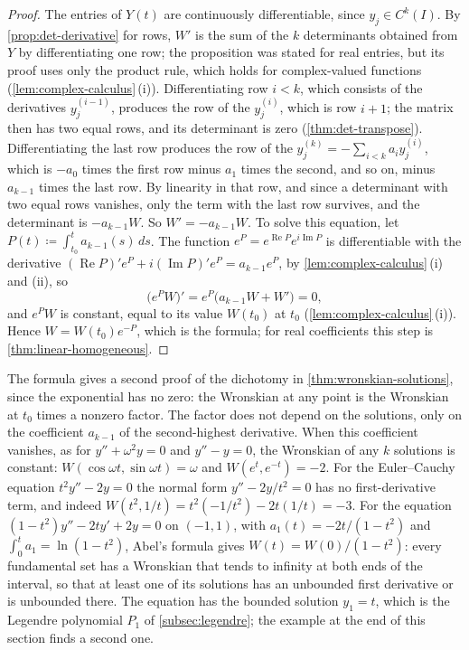 \begin{proof}
The entries of $Y(t)$ are continuously differentiable, since $y_j\in C^k(I)$. By \cref{prop:det-derivative} for rows, $W'$ is the sum of the $k$ determinants obtained from $Y$ by differentiating one row; the proposition was stated for real entries, but its proof uses only the product rule, which holds for complex-valued functions (\cref{lem:complex-calculus}\,(i)). Differentiating row $i<k$, which consists of the derivatives $y_j^{(i-1)}$, produces the row of the $y_j^{(i)}$, which is row $i+1$; the matrix then has two equal rows, and its determinant is zero (\cref{thm:det-transpose}). Differentiating the last row produces the row of the $y_j^{(k)}=-\sum_{i<k}a_iy_j^{(i)}$, which is $-a_0$ times the first row minus $a_1$ times the second, and so on, minus $a_{k-1}$ times the last row. By linearity in that row, and since a determinant with two equal rows vanishes, only the term with the last row survives, and the determinant is $-a_{k-1}W$. So $W'=-a_{k-1}W$. To solve this equation, let $P(t)\coloneqq\int_{t_0}^ta_{k-1}(s)\,ds$. The function $e^P=e^{\operatorname{Re}P}e^{i\operatorname{Im}P}$ is differentiable with the derivative $(\operatorname{Re}P)'e^P+i(\operatorname{Im}P)'e^P=a_{k-1}e^P$, by \cref{lem:complex-calculus}\,(i) and (ii), so
\[
\bigl(e^PW\bigr)'=e^P\bigl(a_{k-1}W+W'\bigr)=0 ,
\]
and $e^PW$ is constant, equal to its value $W(t_0)$ at $t_0$ (\cref{lem:complex-calculus}\,(i)). Hence $W=W(t_0)e^{-P}$, which is the formula; for real coefficients this step is \cref{thm:linear-homogeneous}.
\end{proof}

The formula gives a second proof of the dichotomy in \cref{thm:wronskian-solutions}, since the exponential has no zero: the Wronskian at any point is the Wronskian at $t_0$ times a nonzero factor. The factor does not depend on the solutions, only on the coefficient $a_{k-1}$ of the second-highest derivative. When this coefficient vanishes, as for $y''+\omega^2y=0$ and $y''-y=0$, the Wronskian of any $k$ solutions is constant: $W(\cos\omega t,\sin\omega t)=\omega$ and $W(e^t,e^{-t})=-2$. For the Euler--Cauchy equation $t^2y''-2y=0$ the normal form $y''-2y/t^2=0$ has no first-derivative term, and indeed $W(t^2,1/t)=t^2(-1/t^2)-2t(1/t)=-3$. For the equation $(1-t^2)y''-2ty'+2y=0$ on $(-1,1)$, with $a_1(t)=-2t/(1-t^2)$ and $\int_0^ta_1=\ln(1-t^2)$, Abel's formula gives $W(t)=W(0)/(1-t^2)$: every fundamental set has a Wronskian that tends to infinity at both ends of the interval, so that at least one of its solutions has an unbounded first derivative or is unbounded there. The equation has the bounded solution $y_1=t$, which is the Legendre polynomial $P_1$ of \cref{subsec:legendre}; the example at the end of this section finds a second one.

